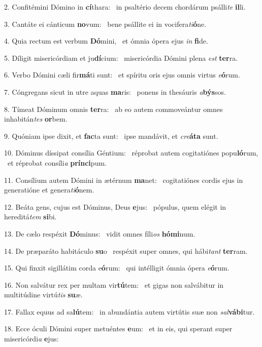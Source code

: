 2. Confitémini Dómino in \textbf{cí}thara: \ast\  in psaltério decem chordárum psálli\textit{te} \textbf{il}li.\

3. Cantáte ei cánticum \textbf{no}vum: \ast\  bene psállite ei in vocifera\textit{ti}\textbf{ó}ne.\

4. Quia rectum est verbum \textbf{Dó}mini, \ast\  et ómnia ópera ejus \textit{in} \textbf{fi}de.\

5. Díligit misericórdiam et ju\textbf{dí}cium: \ast\  misericórdia Dómini plena \textit{est} \textbf{ter}ra.\

6. Verbo Dómini cæli fir\textbf{má}ti sunt: \ast\  et spíritu oris ejus omnis virtus \textit{e}\textbf{ó}rum.\

7. Cóngregans sicut in utre aquas \textbf{ma}ris: \ast\  ponens in thesáuris \textit{a}\textbf{býs}sos.\

8. Tímeat Dóminum omnis \textbf{ter}ra: \ast\  ab eo autem commoveántur omnes inhabitán\textit{tes} \textbf{or}bem.\

9. Quóniam ipse dixit, et \textbf{fac}ta sunt: \ast\  ipse mandávit, et \textit{cre}\textbf{á}\textbf{ta} sunt.\

10. Dóminus díssipat consília Géntium: \dag\  réprobat autem cogitatiónes popu\textbf{ló}rum, \ast\  et réprobat consíli\textit{a} \textbf{prín}\textbf{ci}pum.\

11. Consílium autem Dómini in ætérnum \textbf{ma}net: \ast\  cogitatiónes cordis ejus in generatióne et genera\textit{ti}\textbf{ó}nem.\

12. Beáta gens, cujus est Dóminus, Deus \textbf{e}jus: \ast\  pópulus, quem elégit in hereditá\textit{tem} \textbf{si}bi.\

13. De cælo respéxit \textbf{Dó}minus: \ast\  vidit omnes fíli\textit{os} \textbf{hó}\textbf{mi}num.\

14. De præparáto habitáculo \textbf{su}o \ast\  respéxit super omnes, qui hábi\textit{tant} \textbf{ter}ram.\

15. Qui finxit sigillátim corda e\textbf{ó}rum: \ast\  qui intélligit ómnia ópera \textit{e}\textbf{ó}rum.\

16. Non salvátur rex per multam vir\textbf{tú}tem: \ast\  et gigas non salvábitur in multitúdine virtú\textit{tis} \textbf{su}æ.\

17. Fallax equus ad sa\textbf{lú}tem: \ast\  in abundántia autem virtútis suæ non \textit{sal}\textbf{vá}\textbf{bi}tur.\

18. Ecce óculi Dómini super metuéntes \textbf{e}um: \ast\  et in eis, qui sperant super misericórdi\textit{a} \textbf{e}jus:\

